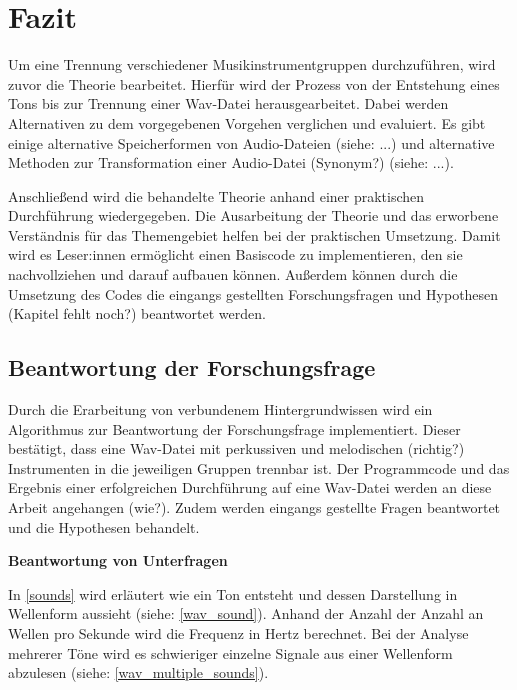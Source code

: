 \chapter{Fazit}
%

Um eine Trennung verschiedener Musikinstrumentgruppen durchzuführen, wird zuvor die Theorie bearbeitet.
Hierfür wird der Prozess von der Entstehung eines Tons bis zur Trennung einer Wav-Datei herausgearbeitet.
Dabei werden Alternativen zu dem vorgegebenen Vorgehen verglichen und evaluiert.
Es gibt einige alternative Speicherformen von Audio-Dateien (siehe: ...) und alternative Methoden zur Transformation einer Audio-Datei (Synonym?) (siehe: ...).

\par

Anschließend wird die behandelte Theorie anhand einer praktischen Durchführung wiedergegeben.
Die Ausarbeitung der Theorie und das erworbene Verständnis für das Themengebiet helfen bei der praktischen Umsetzung.
Damit wird es Leser:innen ermöglicht einen Basiscode zu implementieren, den sie nachvollziehen und darauf aufbauen können.
Außerdem können durch die Umsetzung des Codes die eingangs gestellten Forschungsfragen und Hypothesen (Kapitel fehlt noch?) beantwortet werden.

%
\section{Beantwortung der Forschungsfrage}
%

Durch die Erarbeitung von verbundenem Hintergrundwissen wird ein Algorithmus zur Beantwortung der Forschungsfrage implementiert.
Dieser bestätigt, dass eine Wav-Datei mit perkussiven und melodischen (richtig?) Instrumenten in die jeweiligen Gruppen trennbar ist.
Der Programmcode und das Ergebnis einer erfolgreichen Durchführung auf eine Wav-Datei werden an diese Arbeit angehangen (wie?).
Zudem werden eingangs gestellte Fragen beantwortet und die Hypothesen behandelt.

%
\textbf{Beantwortung von Unterfragen}
%

In \cref{sounds} wird erläutert wie ein Ton entsteht und dessen Darstellung in Wellenform aussieht (siehe: \cref{wav_sound}).
Anhand der Anzahl der Anzahl an Wellen pro Sekunde wird die Frequenz in Hertz berechnet.
Bei der Analyse mehrerer Töne wird es schwieriger einzelne Signale aus einer Wellenform abzulesen (siehe: \cref{wav_multiple_sounds}).

\par

